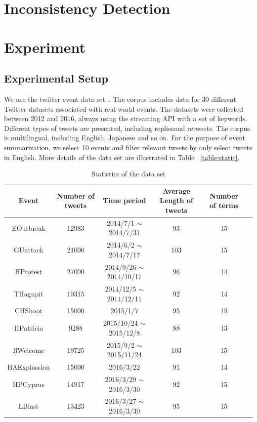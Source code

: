 \documentclass{llncs}
\begin{document}
\section{Inconsistency Detection}\label{sec:inconsistency}

\section{Experiment}\label{sec:experiment}
\subsection{Experimental Setup}
We use the twitter event data set~\cite{}. The corpus includes data for 30 different Twitter datasets associated with real world events. The datasets were collected between 2012 and 2016, always using the streaming API with a set of keywords. Different types of tweets are presented, including repliesand retweets. The corpus is multilingual, including English, Japanese and so on. For the purpose of event summarization, we select 10 events and filter relevant tweets by only select tweets in English. More details of the data set are illustrated in Table ~\ref{table:static}.

\begin{table}[htp]\label{table:static}
\caption{Statistics of the data set}
\begin{center}
\begin{tabular}{|c|c|c|c|c|c|}
    \hline
    Event & Number of tweets & Time period & Average Length of tweets &  Number of terms\\
    \hline
    EOutbreak & 12983 & 2014/7/1 $\sim$ 2014/7/31 & 93 & 15 \\
    \hline
    GUattack & 21000 & 2014/6/2 $\sim$ 2014/7/17 & 103 & 15 \\
    \hline
    HProtest & 27000 & 2014/9/26 $\sim$ 2014/10/17 & 96 & 14 \\
    \hline
    THagupit & 10315 & 2014/12/5 $\sim$ 2014/12/11 & 92 & 14 \\
    \hline
    CHShoot & 15000 & 2015/1/7 & 95 & 15 \\
    \hline
    HPatricia & 9288 & 2015/10/24 $\sim$ 2015/12/8 & 88 & 13 \\
    \hline
    RWelcome & 19725 & 2015/9/2 $\sim$ 2015/11/24 & 103 & 15 \\
    \hline
    BAExplossion & 15000 & 2016/3/22 & 91 & 14 \\
    \hline
    HPCyprus & 14917 & 2016/3/29 $\sim$ 2016/3/30 & 92 & 15\\
    \hline
    LBlast & 13423 & 2016/3/27 $\sim$ 2016/3/30 & 95 & 15\\
    \hline
\end{tabular}
\end{center}
\label{default}
\end{table}
\end{document}
